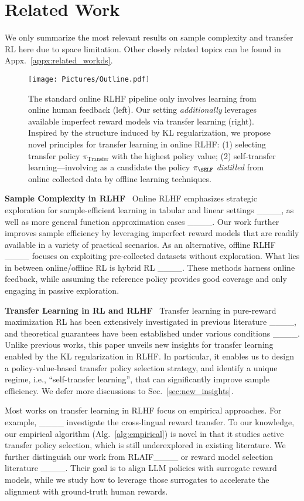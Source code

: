 \section{Related Work}
%

We only summarize the most relevant results on sample complexity and transfer RL here due to space limitation. Other closely related topics can be found in Appx.~\ref{appx:related_workds}.

\begin{figure}[t]
    \centering
    \texttt{[image: Pictures/Outline.pdf]}
    \caption{The standard online RLHF pipeline only involves learning from online human feedback (left).
    Our setting \emph{additionally} leverages available imperfect reward models via transfer learning (right).
    Inspired by the structure induced by KL regularization, we propose novel principles for transfer learning in online RLHF: (1) selecting transfer policy $\pi_\text{Transfer}$ with the highest policy value; (2) self-transfer learning---involving as a candidate the policy $\pi_\SELF$ \emph{distilled} from online collected data by offline learning techniques.
    }\label{fig:outline}
\end{figure}
\textbf{Sample Complexity in RLHF}~
Online RLHF emphasizes strategic exploration for sample-efficient learning in tabular and linear settings ____, as well as more general function approximation cases ____.
%
Our work further improves sample efficiency by leveraging imperfect reward models that are readily available in a variety of practical scenarios. 
%
%
%
As an alternative, offline RLHF ____ focuses on exploiting pre-collected datasets without exploration.
%
%
What lies in between online/offline RL is hybrid RL ____.
These methods harness online feedback, while assuming the reference policy provides good coverage and only engaging in passive exploration.


\textbf{Transfer Learning in RL and RLHF}~
Transfer learning in pure-reward maximization RL has been extensively investigated in previous literature ____, and theoretical guarantees have been established under various conditions ____. Unlike previous works, this paper unveils new insights for transfer learning enabled by the KL regularization in RLHF. In particular, it enables us to design a policy-value-based transfer policy selection strategy, and identify a unique regime, i.e., ``self-transfer learning'', that can significantly improve sample efficiency.
We defer more discussions to Sec.~\ref{sec:new_insights}.
%
%
%

Most works on transfer learning in RLHF focus on empirical approaches.
For example, ____ investigate the cross-lingual reward transfer.
To our knowledge, our empirical algorithm (Alg.~\ref{alg:empirical}) is novel in that it studies active transfer policy selection, which is still underexplored in existing literature.
%
We further distinguish our work from RLAIF____ or reward model selection literature ____. Their goal is to align LLM policies with surrogate reward models, while we study how to leverage those surrogates to accelerate the alignment with ground-truth human rewards.